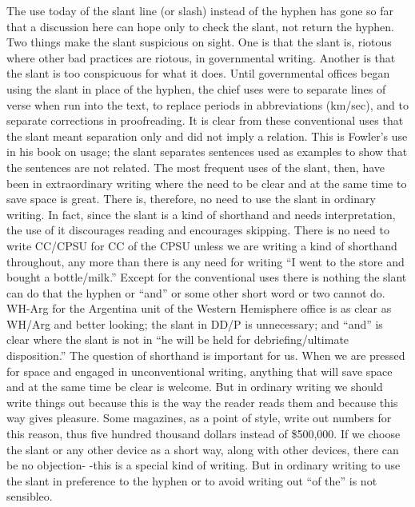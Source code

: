 \documentclass[
    oneside,
    11pt,
]{memoir}
\begin{document}
The use today of the slant line (or slash) instead of the hyphen has gone so far that a discussion here can hope only to check the slant, not return the hyphen. Two things make the slant suspicious on sight. One is that the slant is, riotous where other bad practices are riotous, in governmental writing. Another is that the slant is too conspicuous for what it does. Until governmental offices began using the slant in place of the hyphen, the chief uses were to separate lines of verse when run into the text, to replace periods in abbreviations (km/sec), and to separate corrections in proofreading. It is clear from these conventional uses that the slant meant separation only and did not imply a relation. This is Fowler's use in his book on usage; the slant separates sentences used as examples to show that the sentences are not related. The most frequent uses of the slant, then, have been in extraordinary writing where the need to be clear and at the same time to save space is great. There is, therefore, no need to use the slant in ordinary writing. In fact, since the slant is a kind of shorthand and needs interpretation, the use of it discourages reading and encourages skipping. There is no need to write CC/CPSU for CC of the CPSU unless we are writing a kind of shorthand throughout, any more than there is any need for writing \enquote{I went to the store and bought a bottle/milk.} Except for the conventional uses there is nothing the slant can do that the hyphen or \enquote{and} or some other short word or two cannot do. WH-Arg for the Argentina unit of the Western Hemisphere office is as clear as WH/Arg and better looking; the slant in DD/P is unnecessary; and \enquote{and} is clear where the slant is not in \enquote{he will be held for debriefing/ultimate disposition.} The question of shorthand is important for us. When we are pressed for space and engaged in unconventional writing, anything that will save space and at the same time be clear is welcome. But in ordinary writing we should write things out because this is the way the reader reads them and because this way gives pleasure. Some magazines, as a point of style, write out numbers for this reason, thus five hundred thousand dollars instead of \$500,000. If we choose the slant or any other device as a short way, along with other devices, there can be no objection- -this is a special kind of writing. But in ordinary writing to use the slant in preference to the hyphen or to avoid writing out \enquote{of the} is not sensibleo.
\end{document}
